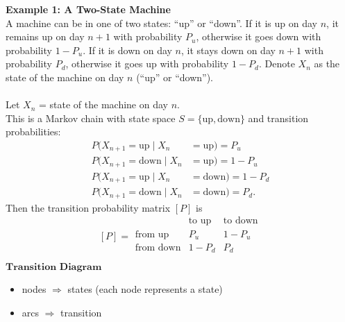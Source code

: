 \documentclass[12pt]{article}
\begin{document}
\noindent\textbf{Example 1: A Two-State Machine}\\
A machine can be in one of two states: ``up'' or ``down''. If it is up on day $n$, it remains up on day $n+1$ with probability $P_u$, otherwise it goes down with probability $1 - P_u$. If it is down on day $n$, it stays down on day $n+1$ with probability $P_d$, otherwise it goes up with probability $1 - P_d$. Denote $X_n$ as the state of the machine on day $n$ (``up'' or ``down''). \\\\
Let $X_n$ = state of the machine on day $n$.\\
This is a Markov chain with state space $S = \{\text{up}, \text{down}\}$ and transition probabilities:
\begin{align*}
    P(X_{n+1} = \text{up} \mid X_{n} &= \text{up}) = P_u \\
    P(X_{n+1} = \text{down} \mid X_{n} &= \text{up}) = 1 - P_u\\
    P(X_{n+1} = \text{up} \mid X_{n} &= \text{down}) = 1 - P_d\\
    P(X_{n+1} = \text{down} \mid X_{n} &= \text{down}) = P_d.
\end{align*}
Then the transition probability matrix $[P]$ is 
\[
[P] = 
\begin{array}{c|cc}
 & \text{to up} & \text{to down}\\\hline
\text{from up} & P_u & 1 - P_u \\
\text{from down} & 1 - P_d & P_d \\
\end{array}
\]
$\textbf{Transition Diagram}$\\
    \begin{center}
    \end{center}
\begin{itemize}
\item nodes $\Rightarrow$ states (each node represents a state)
\item arcs $\Rightarrow$ transition
\end{itemize}
\end{document}

